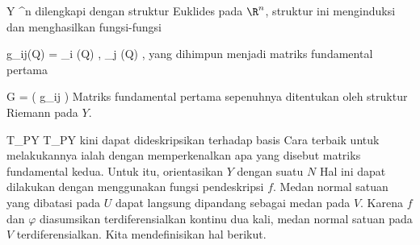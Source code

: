 \mavergleichskette
{\vergleichskette
{ Y
}
{ \subseteq }{ \R^n
}
{  }{
}
{    }{
}
{   }{
}
}
{}{}{}
dilengkapi dengan struktur Euklides pada $\R^n$, struktur ini menginduksi
dan menghasilkan fungsi-fungsi

\mavergleichskettedisp
{\vergleichskette
{ g_{ij}(Q)
}
{ =} { \left\langle  \partial_i \varphi (Q)   ,  \partial_j \varphi (Q)   \right\rangle
}
{ } {
}
{ } {
}
{ } {
}
}
{}{}{,}
yang dihimpun menjadi matriks fundamental pertama
 {} {}

\mavergleichskettedisp
{\vergleichskette
{ G
}
{ =} { \left(  g_{ij}  \right)
}
{ } {
}
{ } {
}
{ } {
}
}
{}{}{}
Matriks fundamental pertama sepenuhnya ditentukan oleh struktur Riemann pada $Y$.

 { T_{P}Y } { T_{P}Y
} {}
kini dapat dideskripsikan terhadap basis
 Cara terbaik untuk melakukannya ialah dengan memperkenalkan apa yang disebut matriks fundamental kedua. Untuk itu, orientasikan $Y$ dengan suatu
$N$
Hal ini dapat dilakukan dengan menggunakan fungsi pendeskripsi $f$. Medan normal satuan yang dibatasi pada $U$ dapat langsung dipandang sebagai medan pada $V$. Karena $f$ dan $\varphi$ diasumsikan terdiferensialkan kontinu dua kali, medan normal satuan pada $V$ terdiferensialkan. Kita mendefinisikan hal berikut.

